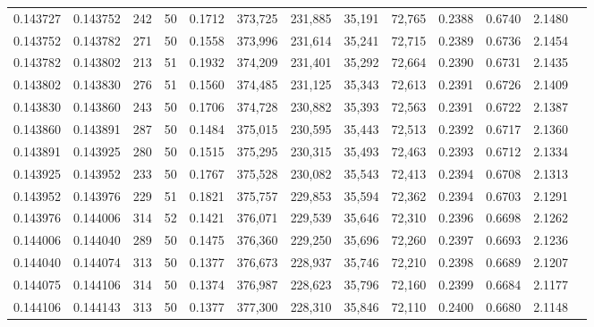 \begin{tabular}{rrrrrrrrrrrrr}
0.143727 & 0.143752 &   242 &  50 &                                     0.1712 & 373,725 & 231,885 &  35,191 &  72,765 & 0.2388 & 0.6740 & 2.1480 \\
0.143752 & 0.143782 &   271 &  50 &                                     0.1558 & 373,996 & 231,614 &  35,241 &  72,715 & 0.2389 & 0.6736 & 2.1454 \\
0.143782 & 0.143802 &   213 &  51 &                                     0.1932 & 374,209 & 231,401 &  35,292 &  72,664 & 0.2390 & 0.6731 & 2.1435 \\
0.143802 & 0.143830 &   276 &  51 &                                     0.1560 & 374,485 & 231,125 &  35,343 &  72,613 & 0.2391 & 0.6726 & 2.1409 \\
0.143830 & 0.143860 &   243 &  50 &                                     0.1706 & 374,728 & 230,882 &  35,393 &  72,563 & 0.2391 & 0.6722 & 2.1387 \\
0.143860 & 0.143891 &   287 &  50 &                                     0.1484 & 375,015 & 230,595 &  35,443 &  72,513 & 0.2392 & 0.6717 & 2.1360 \\
0.143891 & 0.143925 &   280 &  50 &                                     0.1515 & 375,295 & 230,315 &  35,493 &  72,463 & 0.2393 & 0.6712 & 2.1334 \\
0.143925 & 0.143952 &   233 &  50 &                                     0.1767 & 375,528 & 230,082 &  35,543 &  72,413 & 0.2394 & 0.6708 & 2.1313 \\
0.143952 & 0.143976 &   229 &  51 &                                     0.1821 & 375,757 & 229,853 &  35,594 &  72,362 & 0.2394 & 0.6703 & 2.1291 \\
0.143976 & 0.144006 &   314 &  52 &                                     0.1421 & 376,071 & 229,539 &  35,646 &  72,310 & 0.2396 & 0.6698 & 2.1262 \\
0.144006 & 0.144040 &   289 &  50 &                                     0.1475 & 376,360 & 229,250 &  35,696 &  72,260 & 0.2397 & 0.6693 & 2.1236 \\
0.144040 & 0.144074 &   313 &  50 &                                     0.1377 & 376,673 & 228,937 &  35,746 &  72,210 & 0.2398 & 0.6689 & 2.1207 \\
0.144075 & 0.144106 &   314 &  50 &                                     0.1374 & 376,987 & 228,623 &  35,796 &  72,160 & 0.2399 & 0.6684 & 2.1177 \\
0.144106 & 0.144143 &   313 &  50 &                                     0.1377 & 377,300 & 228,310 &  35,846 &  72,110 & 0.2400 & 0.6680 & 2.1148 \\

\end{tabular}

